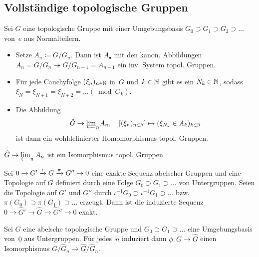 \documentclass{cheat-sheet}
\newcommand{\thra}{\twoheadrightarrow}
\begin{document}
\subsection{Vollständige topologische Gruppen}

\begin{konstr}
  Sei $G$ eine topologische Gruppe mit einer Umgebungsbasis $G_0 \supset G_1 \supset G_2 \supset \ldots$ von~$e$ aus Normalteilern.
  \begin{itemize}
    \item Setze $A_n \coloneqq G/G_n$.
    Dann ist $A_\bullet$ mit den kanon. Abbildungen $A_n = G / G_n \thra G / G_{n-1} = A_{n-1}$ ein inv. System topol. Gruppen.
    \item Für jede Cauchyfolge $(\xi_n)_{n \in \mathbb{N}}$ in~$G$ und~$k \in \mathbb{N}$ gibt es ein $N_k \in \mathbb{N}$, sodass $\xi_N = \xi_{N+1} = \xi_{N+2} = \ldots (\bmod{G_k})$.
    \item Die Abbildung
    \[
      \hat{G} \to {\varprojlim}_{n} A_n, \quad
      [(\xi_n)_{n \in \mathbb{N}}] \mapsto (\xi_{N_k} \in A_k)_{k \in \mathbb{N}}
    \]
    ist dann ein wohldefinierter Homomorphismus topol. Gruppen.
  \end{itemize}
\end{konstr}

\begin{prop}
  $\hat{G} \to \varprojlim_{n} A_n$ ist ein Isomorphismus topol. Gruppen
\end{prop}


\begin{satz}
  Sei $0 \to G' \xrightarrow{\iota} G \xrightarrow{\pi} G'' \to 0$ eine exakte Sequenz abelscher Gruppen und eine Topologie auf $G$ definiert durch eine Folge $G_0 \supset G_1 \supset \ldots$ von Untergruppen.
  Seien die Topologie auf $G'$ und $G''$ durch $\iota^{-1} G_0 \supset \iota^{-1} G_1 \supset \ldots$ bzw. $\pi(G_0) \supset \pi(G_1) \supset \ldots$ erzeugt.
  Dann ist die induzierte Sequenz $0 \to \hat{G}' \to \hat{G} \to \hat{G}'' \to 0$ exakt.
\end{satz}

\begin{kor}
  Sei $G$ eine abelsche topologische Gruppe und $G_0 \supset G_1 \supset \ldots$ eine Umgebungsbasis von~$0$ aus Untergruppen.
  Für jedes~$n$ induziert dann $\phi : G \to \hat{G}$ einen Isomorphismus $G/\hat{G}_n \to \hat{G} / \hat{G}_n$.
\end{kor}
\end{document}
